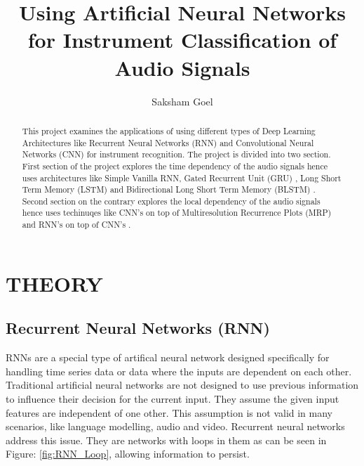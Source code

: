\documentclass[letterpaper, 10 pt, conference]{ieeeconf}  %
\title{\LARGE \bf
Using Artificial Neural Networks for Instrument Classification of Audio Signals
}
\author{Saksham Goel%
}
\begin{document}
\maketitle
\thispagestyle{empty}
\pagestyle{empty}


\begin{abstract}
This project examines the applications of using different types of Deep Learning Architectures like Recurrent Neural Networks (RNN) and Convolutional Neural Networks (CNN) for instrument recognition. The project is divided into two section. First section of the project explores the time dependency of the audio signals hence uses architectures like Simple Vanilla RNN, Gated Recurrent Unit (GRU) \cite{gru_translation}, Long Short Term Memory (LSTM) \cite{lstm_sequence_modelling} \cite{lstm_music_genre} and Bidirectional Long Short Term Memory (BLSTM) \cite{bidirectional_lstm_speech}. Second section on the contrary explores the local dependency of the audio signals hence uses techinuqes like CNN's on top of Multiresolution Recurrence Plots (MRP) \cite{cnn_music_mrp} and RNN's on top of CNN's \cite{cnn_rnn_sleep_staging}.
\end{abstract}



\section{THEORY}

\subsection{\textbf{Recurrent Neural Networks (RNN)}}

RNNs are a special type of artifical neural network designed specifically for handling time series data or data where the inputs are dependent on each other. Traditional artificial neural networks are not designed to use previous information to influence their decision for the current input. They assume the given input features are independent of one other. This assumption is not valid in many scenarios, like language modelling, audio and video. Recurrent neural networks address this issue. They are networks with loops in them as can be seen in Figure: \ref{fig:RNN_Loop}, allowing information to persist.
\end{document}
